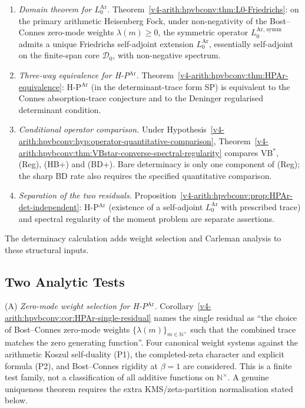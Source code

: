 \begin{enumerate}
\item \emph{Domain theorem for \(L_{0}^{\mathrm{Ar}}\).}
Theorem~\ref{v4-arith:hpvbconv:thm:L0-Friedrichs}: on the primary arithmetic
Heisenberg Fock, under non-negativity of the Bost--Connes zero-mode
weights \(\lambda(m)\geq 0\), the symmetric operator
\(L_{0}^{\mathrm{Ar},\,\mathrm{symm}}\) admits a unique Friedrichs
self-adjoint extension \(L_{0}^{\mathrm{Ar}}\), essentially self-adjoint
on the finite-span core \(\mathcal{D}_{0}\), with non-negative spectrum.
\item \emph{Three-way equivalence for H-P\(^{\mathrm{Ar}}\).}
Theorem~\ref{v4-arith:hpvbconv:thm:HPAr-equivalence}: H-P\(^{\mathrm{Ar}}\)
(in the determinant-trace form SP) is equivalent to the Connes
absorption-trace conjecture and to the Deninger regularised
determinant condition.
\item \emph{Conditional operator comparison.}
Under Hypothesis~\ref{v4-arith:hpvbconv:hyp:operator-quantitative-comparison},
Theorem~\ref{v4-arith:hpvbconv:thm:VBstar-converse-spectral-regularity}
compares VB\(^{*}\), (Reg), (HB+) and (BD+). Bare determinacy is
only one component of (Reg); the sharp BD rate also requires the
specified quantitative comparison.
\item \emph{Separation of the two residuals.}
Proposition~\ref{v4-arith:hpvbconv:prop:HPAr-det-independent}: H-P\(^{\mathrm{Ar}}\)
(existence of a self-adjoint \(L_{0}^{\mathrm{Ar}}\) with prescribed
trace) and spectral regularity of the moment problem are separate
assertions.
\end{enumerate}

The determinacy calculation adds weight selection and Carleman
analysis to these structural inputs.

\subsection{Two Analytic Tests}
\label{v4-arith:hpar-det:wave3-obstruction}

(A) \emph{Zero-mode weight selection for H-P\(^{\mathrm{Ar}}\).}
Corollary~\ref{v4-arith:hpvbconv:cor:HPAr-single-residual} names the
single residual as ``the choice of Bost--Connes zero-mode weights
\(\{\lambda(m)\}_{m\in\mathbb{N}^{\times}}\) such that the combined
trace matches the zero generating function''. Four
canonical weight systems against the arithmetic Koszul
self-duality (P1), the completed-zeta character and explicit formula (P2), and
Bost--Connes rigidity at \(\beta=1\) are considered. This is a finite
test family, not a classification of all additive functions on
\(\mathbb{N}^{\times}\). A genuine uniqueness theorem requires the
extra KMS/zeta-partition normalisation stated below.

